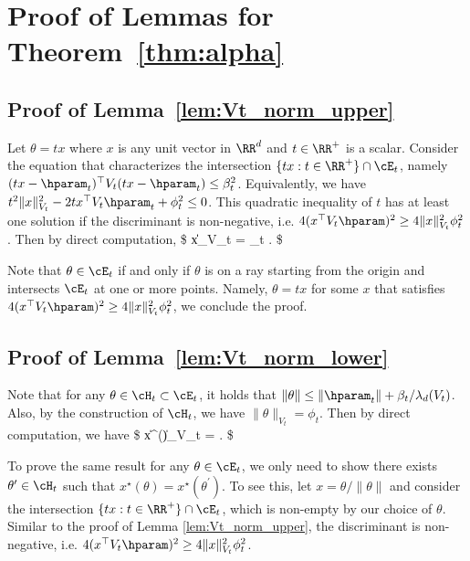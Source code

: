 




\section{Proof of Lemmas for Theorem~\ref{thm:alpha}}
\label{sec:proof_alpha}
\subsection{Proof of Lemma~\ref{lem:Vt_norm_upper}}


\proof{}
	Let $\theta = t x $ where $x$ is any unit vector in $\RR^d$ and $t\in \RR^{+}  $ is a scalar. Consider the equation that characterizes the intersection  $\{t x : t\in\RR^{+} \}\cap \cE_t $, namely
	$
	(t x - \hparam_t)^\top V_t (t x - \hparam_t) \leq  \beta_t^2
	$.
	Equivalently, we have
	$
	t^2\|x\|_{V_t}^2 - 2 t  x^\top V_t \hparam_t + \phi_t^2 \leq 0
	$. This quadratic inequality of $t$ has at least one solution if the discriminant is non-negative, i.e.
	$
	4(x^\top V_t \hparam)^2 \geq 4 \|x\|_{V_t}^2 \phi_t^2 
	$.
	Then by direct computation,
	\$
	\|x\|_{V_t} \leq {} \leq {} =   {\phi_t	}.
	\$

	Note that $\theta \in \cE_t$ if and only if $\theta$ is on a ray starting from the origin and intersects $\cE_t$ at one or more points. Namely, 
	$\theta = t x $ for some $x$ that satisfies $4(x^\top V_t \hparam)^2 \geq 4 \|x\|_{V_t}^2 \phi_t^2$, we conclude the proof.
	

	
\endproof
\subsection{Proof of Lemma~\ref{lem:Vt_norm_lower}}
\proof{}
Note that for any $\theta \in \cH_t \subset\cE_t$, it holds that  $\|\theta\| \leq \|\hparam_t\| +  \beta_t/\lambda_d(V_t)  $. Also, by the construction of $\cH_t$, we have $\|\theta\|_{V_t}  =  \phi_t$. Then by direct computation, we have
	\$
	\|x^\star(\theta )\|_{V_t} =  \geq {} .
	\$

To prove the same result for any $\theta \in \cE_t$, we only need to show there exists $\theta^\prime \in \cH_t$ such that $x^\star(\theta) = x^\star(\theta^\prime)$. To see this,  let $x = \theta/\|\theta\|$ and consider the  intersection  $\{t x : t\in\RR^{+}  \}\cap \cE_t$, which is non-empty by our choice of $\theta$. Similar to the proof of Lemma \ref{lem:Vt_norm_upper}, the discriminant is non-negative, i.e.
	$
	4(x^\top V_t \hparam)^2 \geq 4 \|x\|_{V_t}^2 \phi_t^2 
	$. 

